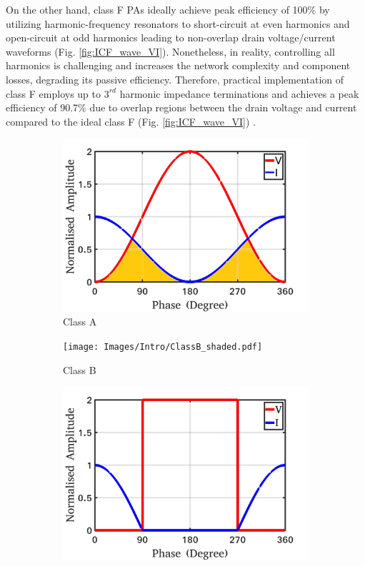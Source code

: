 \documentclass[conference]{IEEEtran}
\begin{document}
On the other hand, class F PAs ideally achieve peak efficiency of 100\% by utilizing harmonic-frequency resonators to short-circuit at even harmonics and open-circuit at odd harmonics leading to non-overlap drain voltage/current waveforms (Fig. \ref{fig:ICF_wave_VI}). Nonetheless, in reality, controlling all harmonics is challenging and increases the network complexity and component losses, degrading its passive efficiency. Therefore, practical implementation of class F employs up to $3^{rd}$ harmonic impedance terminations and achieves a peak efficiency of 90.7\% due to overlap regions between the drain voltage and current compared to the ideal class F (Fig. \ref{fig:ICF_wave_VI}) \cite{Raab_max_eff}.
\begin{figure}[!t]
\centering
\captionsetup{font=footnotesize}
\begin{subfigure}{0.24\textwidth}
\includegraphics[width=1\textwidth]{Images/Intro/ClassA_shaded.pdf}
\caption{Class A}
\label{fig:CA_wave_VI}
\end{subfigure}
\begin{subfigure}{0.24\textwidth}
\texttt{[image: Images/Intro/ClassB\_shaded.pdf]}
\caption{Class B}
\label{fig:CB_wave_VI}
\end{subfigure}
\begin{subfigure}{0.24\textwidth}
\includegraphics[width=1\textwidth]{Images/Intro/ClassF.pdf}

\end{subfigure}
\end{figure}
\end{document}
